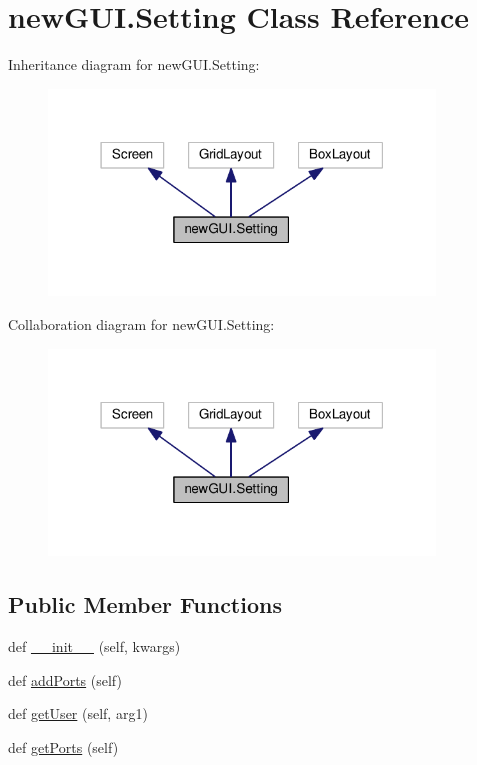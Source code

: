 \hypertarget{classnewGUI_1_1Setting}{}\section{new\+G\+U\+I.\+Setting Class Reference}
\label{classnewGUI_1_1Setting}


Inheritance diagram for new\+G\+U\+I.\+Setting\+:
\nopagebreak
\begin{figure}[H]
\begin{center}
\leavevmode
\includegraphics[width=291pt]{classnewGUI_1_1Setting__inherit__graph}
\end{center}
\end{figure}


Collaboration diagram for new\+G\+U\+I.\+Setting\+:
\nopagebreak
\begin{figure}[H]
\begin{center}
\leavevmode
\includegraphics[width=291pt]{classnewGUI_1_1Setting__coll__graph}
\end{center}
\end{figure}
\subsection*{Public Member Functions}
\begin{DoxyCompactItemize}
\item 
def \hyperlink{classnewGUI_1_1Setting_afc4784c819ae6cc24a81f0b5e85d8b0d}{\+\_\+\+\_\+init\+\_\+\+\_\+} (self, kwargs)
\item 
def \hyperlink{classnewGUI_1_1Setting_a2acee4bc5bc5099cc798d135615f4fa7}{add\+Ports} (self)
\item 
def \hyperlink{classnewGUI_1_1Setting_a347e30268cf3581d496d6a78c97cf6ad}{get\+User} (self, arg1)
\item 
def \hyperlink{classnewGUI_1_1Setting_a6737148d19d9ab0cd02fb433533dfc9e}{get\+Ports} (self)
\end{DoxyCompactItemize}
